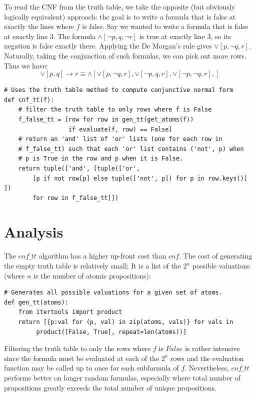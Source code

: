 \documentclass[a4paper,notitlepage]{scrartcl}
\begin{document}
To read the CNF from the truth table, we take the opposite (but obviously
        logically equivalent) approach: the goal is to write a formula
        that is false at exactly the lines where $f$ is false. 
Say we wanted to write a formula that is false at exactly line $3$.
The formula $\land[\lnot p, q, \lnot r]$ is true at exactly line $3$, so its
        negation is false exactly there.
Applying the De Morgan's rule gives $\lor[p, \lnot q, r]$.
Naturally, taking the conjunction of such formulas, we can pick out more rows.
Thus we have:
\[
\lor[p,q]\rightarrow r \equiv 
\land[
\lor[p, \lnot q, r], 
\lor[\lnot p, q, r], 
\lor[\lnot p, \lnot q, r], 
     ]
\]

\begin{verbatim}
# Uses the truth table method to compute conjunctive normal form
def cnf_tt(f):
    # filter the truth table to only rows where f is False 
    f_false_tt = [row for row in gen_tt(get_atoms(f)) 
                  if evaluate(f, row) == False]
    # return an 'and' list of 'or' lists (one for each row in
    # f_false_tt) such that each 'or' list contains ('not', p) when
    # p is True in the row and p when it is False.
    return tuple(['and', [tuple(['or', 
        [p if not row[p] else tuple(['not', p]) for p in row.keys()] ]) 
        for row in f_false_tt]])
\end{verbatim}

\section{Analysis}

The $cnf\_tt$ algorithm has a higher up-front cost than $cnf$.
The cost of generating the empty truth table is relatively small; 
It is a list of the $2^n$ possible valuations (where $n$ is the
        number of atomic propositions):
\begin{verbatim}
# Generates all possible valuations for a given set of atoms.     
def gen_tt(atoms):
    from itertools import product
    return [{p:val for (p, val) in zip(atoms, vals)} for vals in 
         product([False, True], repeat=len(atoms))]
\end{verbatim}
Filtering the truth table to only the rows where $f$ is $False$ is rather
        intensive since the formula must be evaluated at each of the
        $2^n$ rows and the evaluation function may be called up to once
        for each subformula of $f$.
Nevertheless, $cnf\_tt$ performs better on longer random formulas, especially 
        where total number of propositions greatly exceeds the total number of
        unique propositions. 
\end{document}

